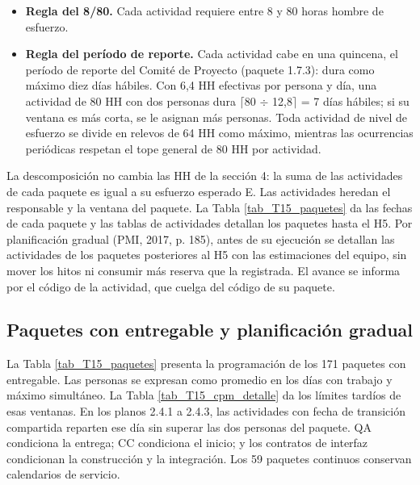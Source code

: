 \begin{itemize}
\item \textbf{Regla del 8/\allowbreak{}80.} Cada actividad requiere entre 8 y 80 horas hombre de esfuerzo.
\item \textbf{Regla del período de reporte.} Cada actividad cabe en una quincena, el período de reporte del Comité de Proyecto (paquete 1.7.3): dura como máximo diez días hábiles. Con 6,4 HH efectivas por persona y día, una actividad de 80 HH con dos personas dura \ensuremath{\lceil}80 \ensuremath{\div} 12,8\ensuremath{\rceil} = 7 días hábiles; si su ventana es más corta, se le asignan más personas. Toda actividad de nivel de esfuerzo se divide en relevos de 64 HH como máximo, mientras las ocurrencias periódicas respetan el tope general de 80 HH por actividad.

\end{itemize}
La descomposición no cambia las HH de la sección 4: la suma de las actividades de cada paquete es igual a su esfuerzo esperado E. Las actividades heredan el responsable y la ventana del paquete. La Tabla \ref{tab_T15_paquetes} da las fechas de cada paquete y las tablas de actividades detallan los paquetes hasta el H5. Por planificación gradual (PMI, 2017, p. 185), antes de su ejecución se detallan las actividades de los paquetes posteriores al H5 con las estimaciones del equipo, sin mover los hitos ni consumir más reserva que la registrada. El avance se informa por el código de la actividad, que cuelga del código de su paquete.

\subsection{Paquetes con entregable y planificación gradual}

La Tabla \ref{tab_T15_paquetes} presenta la programación de los 171 paquetes con entregable. Las personas se expresan como promedio en los días con trabajo y máximo simultáneo. La Tabla \ref{tab_T15_cpm_detalle} da los límites tardíos de esas ventanas. En los planos 2.4.1 a 2.4.3, las actividades con fecha de transición compartida reparten ese día sin superar las dos personas del paquete. QA condiciona la entrega; CC condiciona el inicio; y los contratos de interfaz condicionan la construcción y la integración. Los 59 paquetes continuos conservan calendarios de servicio.

